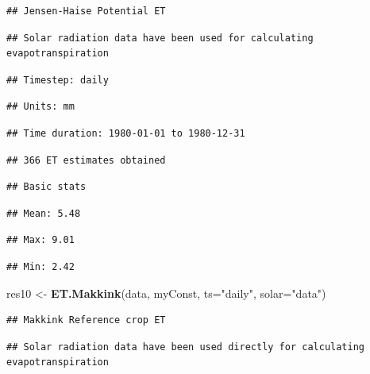 \documentclass[
]{book}
\newenvironment{Shaded}{\begin{snugshade}}{\end{snugshade}}
\newcommand{\DataTypeTok}[1]{\textcolor[rgb]{0.13,0.29,0.53}{#1}}
\newcommand{\KeywordTok}[1]{\textcolor[rgb]{0.13,0.29,0.53}{\textbf{#1}}}
\newcommand{\NormalTok}[1]{#1}
\newcommand{\StringTok}[1]{\textcolor[rgb]{0.31,0.60,0.02}{#1}}
\begin{document}
\begin{verbatim}
## Jensen-Haise Potential ET
\end{verbatim}

\begin{verbatim}
## Solar radiation data have been used for calculating evapotranspiration
\end{verbatim}

\begin{verbatim}
## Timestep: daily
\end{verbatim}

\begin{verbatim}
## Units: mm
\end{verbatim}

\begin{verbatim}
## Time duration: 1980-01-01 to 1980-12-31
\end{verbatim}

\begin{verbatim}
## 366 ET estimates obtained
\end{verbatim}

\begin{verbatim}
## Basic stats
\end{verbatim}

\begin{verbatim}
## Mean: 5.48
\end{verbatim}

\begin{verbatim}
## Max: 9.01
\end{verbatim}

\begin{verbatim}
## Min: 2.42
\end{verbatim}

\begin{Shaded}
\begin{Highlighting}[]
\NormalTok{res10 <-}\StringTok{ }\KeywordTok{ET.Makkink}\NormalTok{(data, myConst, }\DataTypeTok{ts=}\StringTok{"daily"}\NormalTok{, }\DataTypeTok{solar=}\StringTok{"data"}\NormalTok{)}
\end{Highlighting}
\end{Shaded}

\begin{verbatim}
## Makkink Reference crop ET
\end{verbatim}

\begin{verbatim}
## Solar radiation data have been used directly for calculating evapotranspiration
\end{verbatim}
\end{document}
